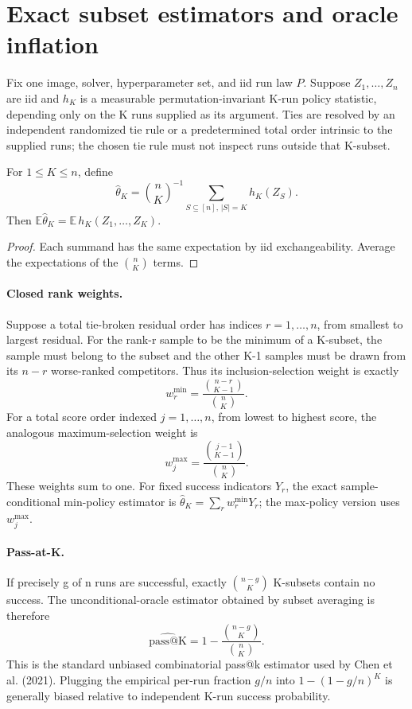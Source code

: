 
\section{Exact subset estimators and oracle inflation}
\label{app:track-r-estimators}

Fix one image, solver, hyperparameter set, and iid run law \(P\).
Suppose \(Z_1,\ldots,Z_n\) are iid and \(h_K\) is a measurable
permutation-invariant K-run policy statistic, depending only on
the K runs supplied as its argument. Ties are resolved by an
independent randomized tie rule or a predetermined total order
intrinsic to the supplied runs; the chosen tie rule must not
inspect runs outside that K-subset.

\begin{proposition}
\label{prop:th1-u}
For \(1\le K\le n\), define
\[
 \widehat\theta_K=
 \binom nK^{-1}\sum_{S\subseteq[n],\,|S|=K}h_K(Z_S).
\]
Then \(\mathbb E\widehat\theta_K
=\mathbb E\,h_K(Z_1,\ldots,Z_K)\).
\end{proposition}
\begin{proof}
Each summand has the same expectation by iid exchangeability.
Average the expectations of the \(\binom nK\) terms.
\end{proof}

\paragraph{Closed rank weights.}
Suppose a total tie-broken residual order has indices
\(r=1,\ldots,n\), from smallest to largest residual.
For the rank-r sample to be the minimum of a K-subset,
the sample must belong to the subset and the other K-1 samples
must be drawn from its \(n-r\) worse-ranked competitors.
Thus its inclusion-selection weight is exactly
\[
 w_r^{\min}=\frac{\binom{n-r}{K-1}}{\binom nK}.
\]
For a total score order indexed \(j=1,\ldots,n\), from
lowest to highest score, the analogous maximum-selection weight is
\[
 w_j^{\max}=\frac{\binom{j-1}{K-1}}{\binom nK}.
\]
These weights sum to one. For fixed success indicators \(Y_r\),
the exact sample-conditional min-policy estimator is
\(\widehat\theta_K=\sum_r w_r^{\min}Y_r\);
the max-policy version uses \(w_j^{\max}\).

\paragraph{Pass-at-K.}
If precisely g of n runs are successful, exactly
\(\binom{n-g}{K}\) K-subsets contain no success.
The unconditional-oracle estimator obtained by subset averaging is
therefore
\[
 \widehat{\mathrm{pass@K}}
 =1-\frac{\binom{n-g}{K}}{\binom nK}.
\]
This is the standard unbiased combinatorial pass@k estimator
used by Chen et al. (2021). Plugging the empirical per-run
fraction \(g/n\) into \(1-(1-g/n)^K\) is generally biased
relative to independent K-run success probability.


